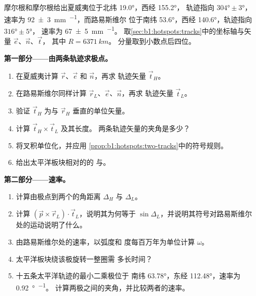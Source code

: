 \begin{problem}
\label{pb:b1:hotspots:1}
摩尔根和摩尔根给出夏威夷位于北纬 \ang{19.0}，西经 \ang{155.2}，
轨迹指向 $\ang{304}\pm\ang{3}$，速率为
\qty[uncertainty-mode=separate]{92 \pm 3}{mm.^{-1}}，而路易斯维尔
位于南纬 \ang{53.6}，西经 \ang{140.6}，轨迹指向 $\ang{316}\pm\ang{5}$，
速率为 \qty[uncertainty-mode=separate]{67 \pm 5}{mm.^{-1}}。
取\cref{sec:b1:hotspots:tracks}中的坐标轴与矢量 $\vec e$、$\vec n$、$\vec t$，
其中 $R = \qty{6371}{km}$。
分量取到小数点后四位。

\medskip
\noindent\textbf{第一部分——由两条轨迹求极点。}
\begin{enumerate}
  \item 在夏威夷计算 $\vec r$、$\vec e$ 和 $\vec n$，再求
        轨迹矢量 $\vec t_H$。
  \item 在路易斯维尔同样计算 $\vec r_L$、$\vec e$、$\vec n$，再求
        轨迹矢量 $\vec t_L$。
  \item 验证 $\vec t_H$ 为与 $\vec r_H$ 垂直的单位矢量。
  \item 计算 $\vec t_H\times\vec t_L$ 及其长度。
        两条轨迹矢量的夹角是多少？
  \item 将叉积单位化，并应用
        \cref{prop:b1:hotspots:two-tracks}中的符号规则。
  \item 给出太平洋板块相对的的
        与。
\end{enumerate}

\medskip
\noindent\textbf{第二部分——速率。}
\begin{enumerate}[resume]
  \item 计算由极点到两个的角距离
        $\Delta_H$ 与 $\Delta_L$。
  \item 计算 $(\vec p\times\vec r_L)\cdot\vec t_L$，说明其为何等于
        $\sin\Delta_L$，并说明其符号对路易斯维尔处的运动说明了什么。
  \item 由路易斯维尔处的速率，以弧度和
        度每百万年为单位计算 $\omega$。
  \item 太平洋板块绕该极旋转一整圈需
        多长时间？
  \item 十五条太平洋轨迹的最小二乘极位于
南纬 \ang{63.78}，东经 \ang{112.48}，速率为 \qty{0.92}{\degree\per\Ma}。
        计算两极之间的夹角，并比较两者的速率。
\end{enumerate}


\end{problem}
